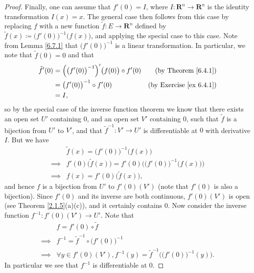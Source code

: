 \begin{proof}
    Finally, one can assume that \(f'(0) = I\), where \(I : \mathbf{R}^n \to \mathbf{R}^n\) is the identity transformation \(I(x) = x\).
    The general case then follows from this case by replacing \(f\) with a new function \(\tilde{f} : E \to \mathbf{R}^n\) defined by \(\tilde{f}(x) \coloneqq \big(f'(0)\big)^{-1} \big(f(x)\big)\), and applying the special case to this case.
    Note from Lemma \ref{6.7.1} that \(\big(f'(0)\big)^{-1}\) is a linear transformation.
    In particular, we note that \(\tilde{f}(0) = 0\) and that
    \begin{align*}
        \tilde{f}'(0) & = \Big(\big(f'(0)\big)^{-1}\Big)'\big(f(0)\big) \circ f'(0) & \text{(by Theorem \ref{6.4.1})}     \\
                      & = \big(f'(0)\big)^{-1} \circ f'(0)                          & \text{(by Exercise \ref{ex 6.4.1})} \\
                      & = I,
    \end{align*}
    so by the special case of the inverse function theorem we know that there exists an open set \(U'\) containing \(0\), and an open set \(V'\) containing \(0\), such that \(\tilde{f}\) is a bijection from \(U'\) to \(V'\), and that \(\tilde{f}^{-1} : V' \to U'\) is differentiable at \(0\) with derivative \(I\).
    But we have
    \begin{align*}
                 & \tilde{f}(x) = \big(f'(0)\big)^{-1} \big(f(x)\big)                                 \\
        \implies & f'(0) \big(\tilde{f}(x)\big) = f'(0) \Big(\big(f'(0)\big)^{-1} \big(f(x)\big)\Big) \\
        \implies & f(x) = f'(0) \big(\tilde{f}(x)\big),
    \end{align*}
    and hence \(f\) is a bijection from \(U'\) to \(f'(0)(V')\)
    (note that \(f'(0)\) is also a bijection).
    Since \(f'(0)\) and its inverse are both continuous, \(f'(0)(V')\) is open (see Theorem \ref{2.1.5}(a)(c)), and it certainly contains \(0\).
    Now consider the inverse function \(f^{-1} : f'(0)(V') \to U'\).
    Note that
    \begin{align*}
                 & f = f'(0) \circ \tilde{f}                                                             \\
        \implies & f^{-1} = \tilde{f}^{-1} \circ \big(f'(0)\big)^{-1}                                    \\
        \implies & \forall y \in f'(0)(V'), f^{-1}(y) = \tilde{f}^{-1}\Big(\big(f'(0)\big)^{-1}(y)\Big).
    \end{align*}
    In particular we see that \(f^{-1}\) is differentiable at \(0\).


\end{proof}
